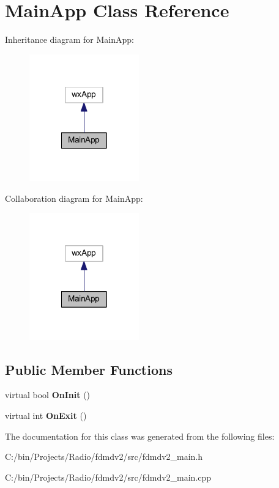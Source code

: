 \hypertarget{class_main_app}{\section{Main\-App Class Reference}
\label{class_main_app}
}


Inheritance diagram for Main\-App\-:
\nopagebreak
\begin{figure}[H]
\begin{center}
\leavevmode
\includegraphics[width=134pt]{class_main_app__inherit__graph}
\end{center}
\end{figure}


Collaboration diagram for Main\-App\-:
\nopagebreak
\begin{figure}[H]
\begin{center}
\leavevmode
\includegraphics[width=134pt]{class_main_app__coll__graph}
\end{center}
\end{figure}
\subsection*{Public Member Functions}
\begin{DoxyCompactItemize}
\item 
\hypertarget{class_main_app_aff3d398e1b61f1016c37d57798f86731}{virtual bool {\bfseries On\-Init} ()}\label{class_main_app_aff3d398e1b61f1016c37d57798f86731}

\item 
\hypertarget{class_main_app_aff49a6bb4a0494d717a3136e9fe17351}{virtual int {\bfseries On\-Exit} ()}\label{class_main_app_aff49a6bb4a0494d717a3136e9fe17351}

\end{DoxyCompactItemize}


The documentation for this class was generated from the following files\-:\begin{DoxyCompactItemize}
\item 
C\-:/bin/\-Projects/\-Radio/fdmdv2/src/fdmdv2\-\_\-main.\-h\item 
C\-:/bin/\-Projects/\-Radio/fdmdv2/src/fdmdv2\-\_\-main.\-cpp\end{DoxyCompactItemize}
